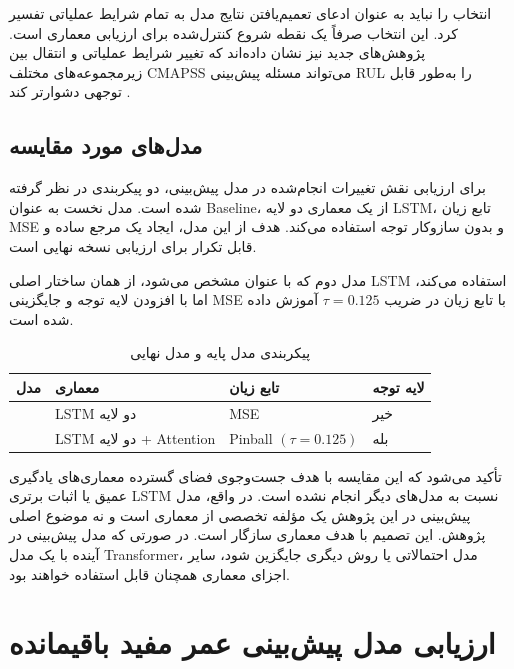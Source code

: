 \documentclass[a4paper,fleqn]{report}
\begin{document}
انتخاب  را نباید به عنوان ادعای تعمیم‌یافتن نتایج مدل به تمام شرایط عملیاتی تفسیر کرد. این انتخاب صرفاً یک نقطه شروع کنترل‌شده برای ارزیابی معماری است. پژوهش‌های جدید نیز نشان داده‌اند که تغییر شرایط عملیاتی و انتقال بین زیرمجموعه‌های مختلف CMAPSS می‌تواند مسئله پیش‌بینی \gls{RUL} را به‌طور قابل توجهی دشوارتر کند \cite{diao2026reliable,song2026degradation}.

\subsection{مدل‌های مورد مقایسه}

برای ارزیابی نقش تغییرات انجام‌شده در مدل پیش‌بینی، دو پیکربندی در نظر گرفته شده است. مدل نخست به عنوان \gls{Baseline}، از یک معماری دو لایه LSTM، تابع زیان MSE و بدون سازوکار توجه استفاده می‌کند. هدف از این مدل، ایجاد یک مرجع ساده و قابل تکرار برای ارزیابی نسخه نهایی است.

مدل دوم که با عنوان  مشخص می‌شود، از همان ساختار اصلی LSTM استفاده می‌کند، اما با افزودن لایه توجه و جایگزینی MSE با تابع زیان  در ضریب $\tau=0.125$ آموزش داده شده است.

\begin{table}[ht]
	\centering
	\caption{پیکربندی مدل پایه و مدل نهایی}
	\label{tab:models-evaluation}
	\begin{tabular}{p{4cm}p{4cm}p{3cm}p{3cm}}
		\toprule
		\textbf{مدل} & \textbf{معماری} & \textbf{تابع زیان} & \textbf{لایه توجه} \\
		\midrule
		\lr{Baseline} & LSTM دو لایه & MSE & خیر \\
		\lr{V2} & LSTM دو لایه + Attention & Pinball $(\tau=0.125)$ & بله \\
		\bottomrule
	\end{tabular}
\end{table}

تأکید می‌شود که این مقایسه با هدف جست‌وجوی فضای گسترده معماری‌های یادگیری عمیق یا اثبات برتری LSTM نسبت به مدل‌های دیگر انجام نشده است. در واقع، مدل پیش‌بینی در این پژوهش یک مؤلفه تخصصی از معماری است و نه موضوع اصلی پژوهش. این تصمیم با هدف معماری سازگار است. در صورتی که مدل پیش‌بینی در آینده با یک مدل \gls{Transformer}، مدل احتمالاتی یا روش دیگری جایگزین شود، سایر اجزای معماری همچنان قابل استفاده خواهند بود.

\section{ارزیابی مدل پیش‌بینی عمر مفید باقیمانده}
\label{sec:rul-results}
\end{document}
